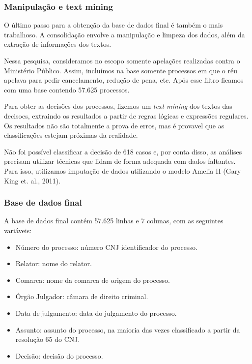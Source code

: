 \documentclass[10pt,]{article}
\begin{document}
\subsubsection{Manipulação e text
mining}\label{manipulacao-e-text-mining}

O último passo para a obtenção da base de dados final é também o mais
trabalhoso. A consolidação envolve a manipulação e limpeza dos dados,
além da extração de informações dos textos.

Nessa pesquisa, consideramos no escopo somente apelações realizadas
contra o Ministério Público. Assim, incluímos na base somente processos
em que o réu apelava para pedir cancelamento, redução de pena, etc. Após
esse filtro ficamos com uma base contendo 57.625 processos.

Para obter as decisões dos processos, fizemos um \emph{text mining} dos
textos das decisoes, extraindo os resultados a partir de regras lógicas
e expressões regulares. Os resultados não são totalmente a prova de
erros, mas é provavel que as classificações estejam próximas da
realidade.

Não foi possível classificar a decisão de 618 casos e, por conta disso,
as análises precisam utilizar técnicas que lidam de forma adequada com
dados faltantes. Para isso, utilizamos imputação de dados utilizando o
modelo Amelia II (Gary King et. al., 2011).

\subsubsection{Base de dados final}\label{base-de-dados-final}

A base de dados final contém 57.625 linhas e 7 colunas, com as seguintes
variáveis:

\begin{itemize}
\itemsep1pt\parskip0pt
\item
  Número do processo: número CNJ identificador do processo.
\item
  Relator: nome do relator.
\item
  Comarca: nome da comarca de origem do processo.
\item
  Órgão Julgador: câmara de direito criminal.
\item
  Data de julgamento: data do julgamento do processo.
\item
  Assunto: assunto do processo, na maioria das vezes classificado a
  partir da resolução 65 do CNJ.
\item
  Decisão: decisão do processo.
\end{itemize}
\end{document}
